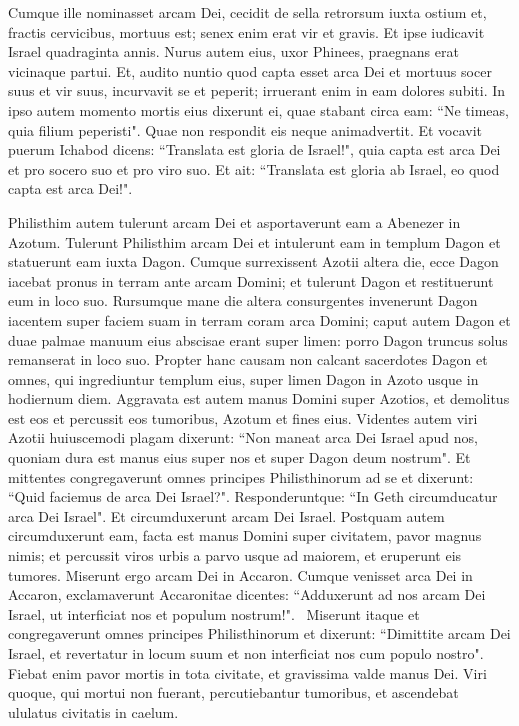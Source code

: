 \begin{biblechapter}
\verse Cumque ille nominasset arcam Dei, cecidit de sella retrorsum iuxta ostium et, fractis cervicibus, mortuus est; senex enim erat vir et gravis. Et ipse iudicavit Israel quadraginta annis. 
\verse Nurus autem eius, uxor Phinees, praegnans erat vicinaque partui. Et, audito nuntio quod capta esset arca Dei et mortuus socer suus et vir suus, incurvavit se et peperit; irruerant enim in eam dolores subiti. 
\verse In ipso autem momento mortis eius dixerunt ei, quae stabant circa eam: “Ne timeas, quia filium peperisti". Quae non respondit eis neque animadvertit. 
\verse Et vocavit puerum Ichabod dicens: “Translata est gloria de Israel!", quia capta est arca Dei et pro socero suo et pro viro suo. 
\verse Et ait: “Translata est gloria ab Israel, eo quod capta est arca Dei!". 
\end{biblechapter}

\begin{biblechapter}  
\verse Philisthim autem tulerunt arcam Dei et asportaverunt eam a Abenezer in Azotum. 
\verse Tulerunt Philisthim arcam Dei et intulerunt eam in templum Dagon et statuerunt eam iuxta Dagon. 
\verse Cumque surrexissent Azotii altera die, ecce Dagon iacebat pronus in terram ante arcam Domini; et tulerunt Dagon et restituerunt eum in loco suo. 
\verse Rursumque mane die altera consurgentes invenerunt Dagon iacentem super faciem suam in terram coram arca Domini; caput autem Dagon et duae palmae manuum eius abscisae erant super limen: 
\verse porro Dagon truncus solus remanserat in loco suo. Propter hanc causam non calcant sacerdotes Dagon et omnes, qui ingrediuntur templum eius, super limen Dagon in Azoto usque in hodiernum diem. 
\verse Aggravata est autem manus Domini super Azotios, et demolitus est eos et percussit eos tumoribus, Azotum et fines eius. 
\verse Videntes autem viri Azotii huiuscemodi plagam dixerunt: “Non maneat arca Dei Israel apud nos, quoniam dura est manus eius super nos et super Dagon deum nostrum". 
\verse Et mittentes congregaverunt omnes principes Philisthinorum ad se et dixerunt: “Quid faciemus de arca Dei Israel?". Responderuntque: “In Geth circumducatur arca Dei Israel". Et circumduxerunt arcam Dei Israel. 
\verse Postquam autem circumduxerunt eam, facta est manus Domini super civitatem, pavor magnus nimis; et percussit viros urbis a parvo usque ad maiorem, et eruperunt eis tumores. 
\verse Miserunt ergo arcam Dei in Accaron. Cumque venisset arca Dei in Accaron, exclamaverunt Accaronitae dicentes: “Adduxerunt ad nos arcam Dei Israel, ut interficiat nos et populum nostrum!".  
\verse Miserunt itaque et congregaverunt omnes principes Philisthinorum et dixerunt: “Dimittite arcam Dei Israel, et revertatur in locum suum et non interficiat nos cum populo nostro". 
\verse Fiebat enim pavor mortis in tota civitate, et gravissima valde manus Dei. Viri quoque, qui mortui non fuerant, percutiebantur tumoribus, et ascendebat ululatus civitatis in caelum. 
\end{biblechapter}

